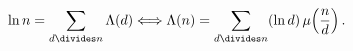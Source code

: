 \[\mathop{\ln\/}\nolimits n=\sum_{d\divides n}\mathop{\Lambda\/}\nolimits\!\left%
(d\right)\Longleftrightarrow\mathop{\Lambda\/}\nolimits\!\left(n\right)=\sum_{%
d\divides n}(\mathop{\ln\/}\nolimits d)\mathop{\mu\/}\nolimits\!\left(\frac{n}%
{d}\right).\]